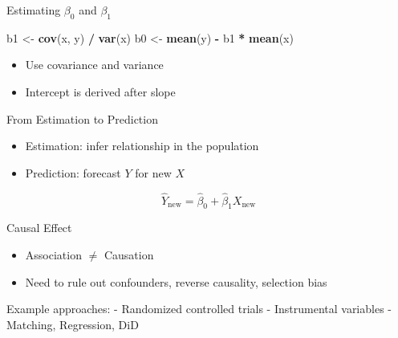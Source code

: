 \documentclass[
  ignorenonframetext,
]{beamer}
\newenvironment{Shaded}{\begin{snugshade}}{\end{snugshade}}
\newcommand{\FunctionTok}[1]{\textcolor[rgb]{0.13,0.29,0.53}{\textbf{#1}}}
\newcommand{\NormalTok}[1]{#1}
\newcommand{\OtherTok}[1]{\textcolor[rgb]{0.56,0.35,0.01}{#1}}
\newcommand{\SpecialCharTok}[1]{\textcolor[rgb]{0.81,0.36,0.00}{\textbf{#1}}}
\providecommand{\tightlist}{%
  \setlength{\itemsep}{0pt}\setlength{\parskip}{0pt}}
\begin{document}
\begin{frame}[fragile]{Estimating \(\beta_0\) and \(\beta_1\)}
\protect\hypertarget{estimating-beta_0-and-beta_1}{}
\begin{Shaded}
\begin{Highlighting}[]
\NormalTok{b1 }\OtherTok{\textless{}{-}} \FunctionTok{cov}\NormalTok{(x, y) }\SpecialCharTok{/} \FunctionTok{var}\NormalTok{(x)}
\NormalTok{b0 }\OtherTok{\textless{}{-}} \FunctionTok{mean}\NormalTok{(y) }\SpecialCharTok{{-}}\NormalTok{ b1 }\SpecialCharTok{*} \FunctionTok{mean}\NormalTok{(x)}
\end{Highlighting}
\end{Shaded}

\begin{itemize}
\tightlist
\item
  Use covariance and variance
\item
  Intercept is derived after slope
\end{itemize}

\end{frame}

\begin{frame}{From Estimation to Prediction}
\protect\hypertarget{from-estimation-to-prediction}{}
\begin{itemize}
\tightlist
\item
  Estimation: infer relationship in the population
\item
  Prediction: forecast \(Y\) for new \(X\)
\end{itemize}

\[
\hat{Y}_{\text{new}} = \hat{\beta}_0 + \hat{\beta}_1 X_{\text{new}}
\]

\end{frame}

\begin{frame}{Causal Effect}
\protect\hypertarget{causal-effect}{}
\begin{itemize}
\tightlist
\item
  Association \(\neq\) Causation
\item
  Need to rule out confounders, reverse causality, selection bias
\end{itemize}

Example approaches: - Randomized controlled trials - Instrumental
variables - Matching, Regression, DiD

\end{frame}
\end{document}
